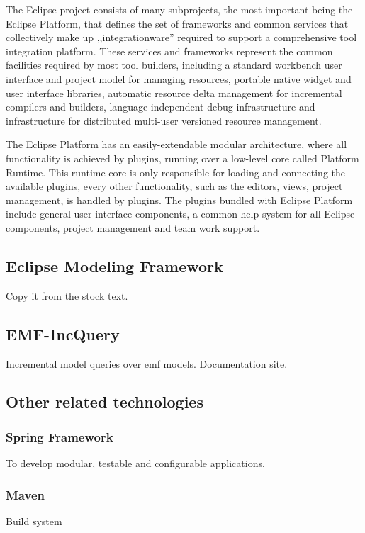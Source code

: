 The Eclipse project consists of many subprojects, the most important being the
Eclipse Platform, that defines the set of frameworks and common services that
collectively make up ,,integrationware'' required to support a comprehensive
tool integration platform. These services and frameworks represent the common
facilities required by most tool builders, including a standard workbench user
interface and project model for managing resources, portable native widget and
user interface libraries, automatic resource delta management for incremental
compilers and builders, language-independent debug infrastructure and
infrastructure for distributed multi-user versioned resource management.

The Eclipse Platform has an easily-extendable modular architecture, where all
functionality is achieved by plugins, running over a low-level core called
Platform Runtime. This runtime core is only responsible for loading and
connecting the available plugins, every other functionality, such as the
editors, views, project management, is handled by plugins. The plugins bundled
with Eclipse Platform include general user interface components, a common help
system for all Eclipse components, project management and team work support.


\subsection{Eclipse Modeling Framework}
Copy it from the stock text.

\subsection{EMF-IncQuery} 
Incremental model queries over emf models. Documentation site.



\subsection{Other related technologies}

\subsubsection{Spring Framework}
To develop modular, testable and configurable applications.
\subsubsection{Maven}
Build system
